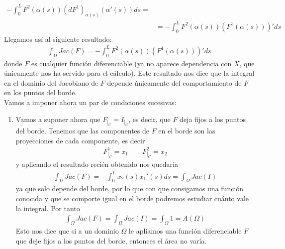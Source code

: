 \begin{observacion}
\begin{enumerate}[start=4]
\begin{align*}
            - \int_0^L F^2(\alpha(s))(dF^1)_{\alpha(s)}(\alpha'(s)) ds =\\
            &=
            -\int_0^L F^2(\alpha(s))(F^1(\alpha(s)))' ds
        \end{align*}
        Llegamos así al siguiente resultado:
        \begin{gather*}
            \boxed{\int_\Omega Jac(F) = -\int_0^L F^2(\alpha(s))(F^1(\alpha(s)))' ds}
        \end{gather*}
        donde $F$ es cualquier función diferenciable (ya no aparece dependencia con $X$, que únicamente nos ha servido para el cálculo). Este resultado nos dice que la integral en el dominio del Jacobiano de $F$ depende únicamente del comportamiento de $F$ en los puntos del borde. \\

        Vamos a imponer ahora un par de condiciones sucesivas:
        \begin{enumerate}
            \item Vamos a suponer ahora que $F_{|_C}=I_{|_C}$, es decir, que $F$ deja fijos a los puntos del borde. Tenemos que las componentes de $F$ en el borde son las proyecciones de cada componente, es decir
            \begin{gather*}
                F^1_{|_C} = x_1 \qquad F^2_{|_C} = x_2
            \end{gather*}
            y aplicando el resultado recién obtenido nos quedaría
            \begin{gather*}
                \int_\Omega Jac(F) = - \int_0^L x_2(s)x_1'(s) ds = \int_\Omega Jac(I)
            \end{gather*}
            ya que solo depende del borde, por lo que con que consigamos una función conocida y que se comporte igual en el borde podremos estudiar cuánto vale la integral. Por tanto
            \begin{gather*}
                \int_\Omega Jac(F) = \int_\Omega Jac(I) = \int_\Omega 1 = A(\Omega)
            \end{gather*}
            Esto nos dice que si a un dominio $\Omega$ le apliamos una función diferenciable $F$ que deje fijos a los puntos del borde, entonces el área no varía.


\end{enumerate}
\end{enumerate}
\end{observacion}
